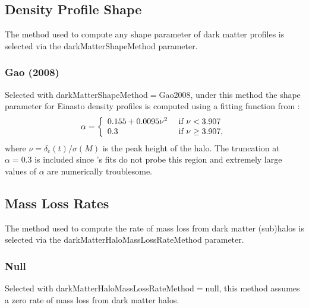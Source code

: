 \subsection{Density Profile Shape}\label{sec:DarkMatterProfileShape}

The method used to compute any shape parameter of dark matter profiles is selected via the {\normalfont \ttfamily darkMatterShapeMethod} parameter.

\subsubsection{Gao (2008)}

Selected with {\normalfont \ttfamily darkMatterShapeMethod}$=${\normalfont \ttfamily Gao2008}, under this method the shape parameter for Einasto density profiles is computed using a fitting function from \cite{gao_redshift_2008}:
\begin{equation}
\alpha = \left\{ \begin{array}{ll} 0.155 + 0.0095\nu^2 & \hbox{ if } \nu < 3.907 \\ 0.3 & \hbox{ if } \nu \ge 3.907, \end{array} \right.
\end{equation}
where $\nu=\delta_{\mathrm c}(t)/\sigma(M)$ is the peak height of the halo. The truncation at $\alpha = 0.3$ is included since \cite{gao_redshift_2008}'s fits do not probe this region and extremely large values of $\alpha$ are numerically troublesome.

\subsection{Mass Loss Rates}

The method used to compute the rate of mass loss from dark matter (sub)halos is selected via the {\normalfont \ttfamily darkMatterHaloMassLossRateMethod} parameter.

\subsubsection{Null}

Selected with {\normalfont \ttfamily darkMatterHaloMassLossRateMethod}$=${\normalfont \ttfamily null}, this method assumes a zero rate of mass loss from dark matter halos.

